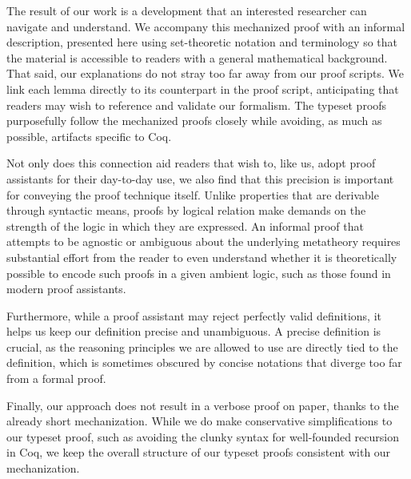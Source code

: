 \documentclass[acmsmall,screen=true,
\ifpublic review=false\else,review=true\fi
  ,anonymous=\ifanonymous true\else false\fi]{acmart}
\begin{document}
The result of our work is a development that an interested researcher can
navigate and understand. We accompany this mechanized proof with an informal
description, presented here using set-theoretic notation and terminology so that
the material is accessible to readers with a general mathematical background.
That said, our explanations do not stray too far away from our proof scripts.
We link each lemma directly to its counterpart in the proof script,
anticipating that readers may wish to reference and validate our formalism.
The typeset proofs purposefully follow the
mechanized proofs closely while avoiding, as much as possible, artifacts specific to Coq.

Not only does this connection aid readers that wish to, like us, adopt proof
assistants for their day-to-day use, we also find that this precision is
important for conveying the proof technique itself. Unlike properties that are
derivable through syntactic means, proofs by logical relation make demands on
the strength of the logic in which they are expressed. An informal proof that
attempts to be agnostic or ambiguous about the underlying
metatheory %
requires substantial
effort from the reader to even understand whether it is theoretically
possible to encode such proofs in a given ambient logic, such as those found
in modern proof assistants.

Furthermore, while a proof assistant may reject perfectly valid definitions,
it helps us keep our definition precise and unambiguous. A precise definition
is crucial, as the reasoning principles we are allowed to use are directly tied
to the definition, which is sometimes obscured by concise notations that
diverge too far from a formal proof.

Finally, our approach does not result in a verbose proof on paper, thanks to
the already short mechanization. While we do make conservative simplifications
to our typeset proof, such as avoiding the clunky syntax for well-founded
recursion in Coq, we keep the overall structure of our typeset proofs
consistent with our mechanization.
\end{document}

